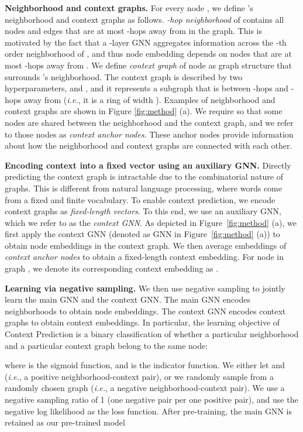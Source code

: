 \documentclass{article} \usepackage{iclr2020_conference,times}
\numberwithin{equation}{section}
\theoremstyle{plain}
\theoremstyle{definition}
\theoremstyle{remark}
\newcommand{\ie}{\textit{i.e.}}
\begin{document}
{\bf Neighborhood and context graphs.}
For every node , we define 's neighborhood and context graphs as follows. 
\emph{-hop neighborhood} of  contains all nodes and edges that are at most -hops away from  in the graph. This is motivated by the fact that a -layer GNN aggregates information across the -th order neighborhood of , and thus node embedding  depends on nodes that are at most -hops away from .
We define \emph{context graph} of node  as graph structure that surrounds 's neighborhood. The context graph is described by two hyperparameters,  and , and it represents a subgraph that is between -hops and -hops away from  (\ie, it is a ring of width ). Examples of neighborhood and context graphs are shown in Figure \ref{fig:method} (a). We require  so that some nodes are shared between the neighborhood and the context graph, and we refer to those nodes as \emph{context anchor nodes}. These anchor nodes provide information about how the neighborhood and context graphs are connected with each other.

{\bf Encoding context into a fixed vector using an auxiliary GNN.}
Directly predicting the context graph is intractable due to the combinatorial nature of graphs. This is different from natural language processing, where words come from a fixed and finite vocabulary.
To enable context prediction, we encode context graphs as \emph{fixed-length vectors}.
To this end, we use an auxiliary GNN, which we refer to as the \emph{context GNN}. 
As depicted in Figure~\ref{fig:method} (a), we first apply the context GNN (denoted as GNN in Figure~\ref{fig:method} (a)) to obtain node embeddings in the context graph. We then average embeddings of \emph{context anchor nodes} to obtain a fixed-length context embedding. For node  in graph , we denote its corresponding context embedding as .

{\bf Learning via negative sampling.}
We then use negative sampling \citep{mikolov2013distributed, ying2018graph} to jointly learn the main GNN and the context GNN. The main GNN encodes neighborhoods to obtain node embeddings. The context GNN encodes context graphs to obtain context embeddings. In particular, the learning objective of Context Prediction is a binary classification of whether a particular neighborhood and a particular context graph belong to the same node:

where  is the sigmoid function, and  is the indicator function. We either let  and  (\ie, a positive neighborhood-context pair), or we randomly sample  from a randomly chosen graph  (\ie, a negative neighborhood-context pair). We use a negative sampling ratio of 1 (one negative pair per one positive pair), and  use the negative log likelihood as the loss function.
After pre-training, the main GNN is retained as our pre-trained model
 
\end{document}
